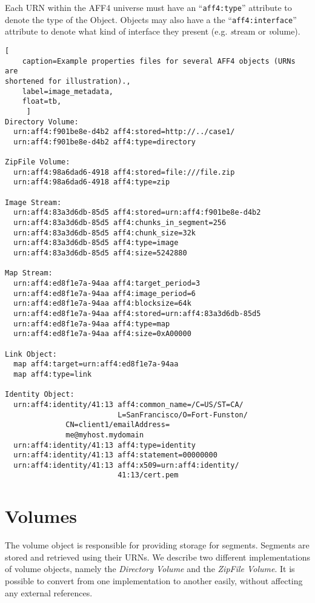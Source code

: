 \documentclass[10pt, conference]{IEEEtran}
\begin{document}
Each URN within the AFF4 universe must have an ``\texttt{aff4:type}''
attribute to denote the type of the Object. Objects may also have a
the ``\texttt{aff4:interface}'' attribute to denote what kind of
interface they present (e.g. {\emph stream} or {\emph volume}).

\begin{lstlisting}[
	caption=Example properties files for several AFF4 objects (URNs are
shortened for illustration).,
	label=image_metadata,
	float=tb,
	 ]
Directory Volume:
  urn:aff4:f901be8e-d4b2 aff4:stored=http://../case1/
  urn:aff4:f901be8e-d4b2 aff4:type=directory

ZipFile Volume:
  urn:aff4:98a6dad6-4918 aff4:stored=file:///file.zip
  urn:aff4:98a6dad6-4918 aff4:type=zip

Image Stream:
  urn:aff4:83a3d6db-85d5 aff4:stored=urn:aff4:f901be8e-d4b2
  urn:aff4:83a3d6db-85d5 aff4:chunks_in_segment=256
  urn:aff4:83a3d6db-85d5 aff4:chunk_size=32k
  urn:aff4:83a3d6db-85d5 aff4:type=image
  urn:aff4:83a3d6db-85d5 aff4:size=5242880

Map Stream:
  urn:aff4:ed8f1e7a-94aa aff4:target_period=3
  urn:aff4:ed8f1e7a-94aa aff4:image_period=6
  urn:aff4:ed8f1e7a-94aa aff4:blocksize=64k
  urn:aff4:ed8f1e7a-94aa aff4:stored=urn:aff4:83a3d6db-85d5
  urn:aff4:ed8f1e7a-94aa aff4:type=map
  urn:aff4:ed8f1e7a-94aa aff4:size=0xA00000

Link Object:
  map aff4:target=urn:aff4:ed8f1e7a-94aa
  map aff4:type=link

Identity Object:
  urn:aff4:identity/41:13 aff4:common_name=/C=US/ST=CA/
                          L=SanFrancisco/O=Fort-Funston/
			  CN=client1/emailAddress=
			  me@myhost.mydomain
  urn:aff4:identity/41:13 aff4:type=identity
  urn:aff4:identity/41:13 aff4:statement=00000000
  urn:aff4:identity/41:13 aff4:x509=urn:aff4:identity/
                          41:13/cert.pem
\end{lstlisting}

\section{Volumes}
The volume object is responsible for providing storage for
segments. Segments are stored and retrieved using their URNs. We
describe two different implementations of volume objects, namely the
{\em Directory Volume} and the {\em ZipFile Volume}. It is possible to
convert from one implementation to another easily, without affecting
any external references.
\end{document}
